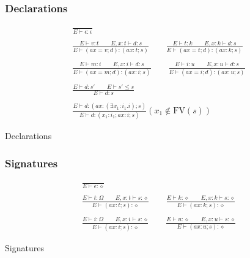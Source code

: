 \documentclass[twoside]{article}
\newcommand{\f}[1]{\mbox{#1}}
\begin{document}
\subsubsection*{Declarations \hfill
{}
}

\begin{displaymath}
\begin{array}{c}
\displaystyle
\frac{
}{
E \vdash \epsilon : \epsilon
}
\\\\\displaystyle
\frac{
E \vdash v : t
\qquad
E,x:t \vdash d : s
}{
E \vdash (ax=v;d) : (ax:t;s)
}
\qquad
\frac{
E \vdash t : k
\qquad
E,x:k \vdash d : s
}{
E \vdash (ax=t;d) : (ax:k;s)
}
\\\\\displaystyle
\frac{
E \vdash m : i
\qquad
E,x:i \vdash d : s
}{
E \vdash (ax=m;d) : (ax:i;s)
}
\qquad
\frac{
E \vdash i : u
\qquad
E,x:u \vdash d : s
}{
E \vdash (ax=i;d) : (ax:u;s)
}
\\\\\displaystyle
\frac{
E \vdash d : s'
\qquad
E \vdash s' \leq s
}{
E \vdash d : s
}
\\\\\displaystyle
\frac{
E \vdash d : (ax:(\exists x_1:i_1.i);s)
}{
E \vdash d : (x_1:i_1;ax:i;s)
}(x_1 \notin \f{FV}(s))
\end{array}
\end{displaymath}
\begin{center}Declarations\end{center}



\subsubsection*{Signatures \hfill
{}
}

\begin{displaymath}
\begin{array}{c}
\displaystyle
\frac{
}{
E \vdash \epsilon : \diamond
}
\\\\\displaystyle
\frac{
E \vdash t : \Omega
\qquad
E,x:t \vdash s : \diamond
}{
E \vdash (ax:t;s) : \diamond
}
\qquad
\frac{
E \vdash k : \diamond
\qquad
E,x:k \vdash s : \diamond
}{
E \vdash (ax:k;s) : \diamond
}
\\\\\displaystyle
\frac{
E \vdash i : \Omega
\qquad
E,x:i \vdash s : \diamond
}{
E \vdash (ax:i;s) : \diamond
}
\qquad
\frac{
E \vdash u : \diamond
\qquad
E,x:u \vdash s : \diamond
}{
E \vdash (ax:u;s) : \diamond
}
\end{array}
\end{displaymath}
\begin{center}Signatures\end{center}
\end{document}
